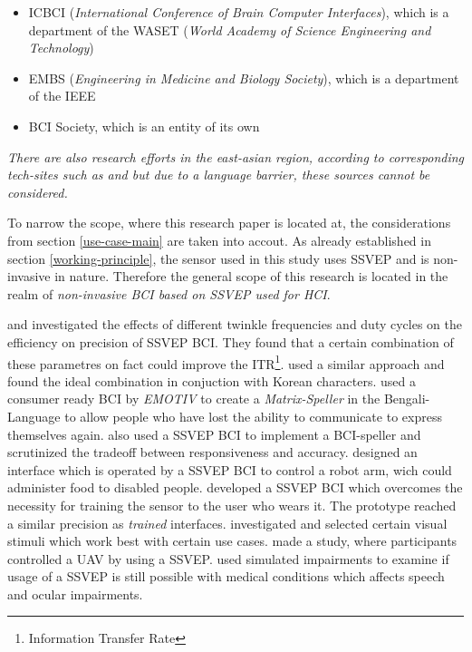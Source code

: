             \begin{itemize}
                \item ICBCI (\textit{International Conference of Brain Computer Interfaces}), which is a department of the WASET (\textit{World Academy of Science Engineering and Technology})
                \item EMBS (\textit{Engineering in Medicine and Biology Society}), which is a department of the IEEE
                \item BCI Society, which is an entity of its own
            \end{itemize}

            \medskip

            \emph{There are also research efforts in the east-asian region, according to corresponding tech-sites such as \cite{GlobalTimes.20042021} and \cite{TechwireAsia.24052021} but due to a language barrier, these sources cannot be considered.}

            \medskip

            To narrow the scope, where this research paper is located at, the considerations from section \ref*{use-case-main} are taken into accout. As already established in section \ref*{working-principle}, the sensor used in this study uses SSVEP and is non-invasive in nature. Therefore the general scope of this research is located in the realm of \textit{non-invasive BCI based on SSVEP used for HCI}.

            \medskip

            \cite{Oralhan.2016} and \cite{Resalat.2011} investigated the effects of different twinkle frequencies and duty cycles on the efficiency on precision of SSVEP BCI. They found that a certain combination of these parametres on fact could improve the ITR\footnote{Information Transfer Rate}. \cite{Lee.2016} used a similar approach and found the ideal combination in conjuction with Korean characters.
            \cite{S.M.Abdullah.2014} used a consumer ready BCI by \textit{EMOTIV} to create a \textit{Matrix-Speller} in the Bengali-Language to allow people who have lost the ability to communicate to express themselves again. 
            \cite{Chen.2020} also used a SSVEP BCI to implement a BCI-speller and scrutinized the tradeoff between responsiveness and accuracy.
            \cite{Chen.2020} designed an interface which is operated by a SSVEP BCI to control a robot arm, wich could administer food to disabled people.
            \cite{Soroush.2018} developed a SSVEP BCI which overcomes the necessity for training the sensor to the user who wears it. The prototype reached a similar precision as \textit{trained} interfaces.
            \cite{Gergondet.2015} investigated and selected certain visual stimuli which work best with certain use cases.
            \cite{Merino.2017} made a study, where participants controlled a UAV by using a SSVEP.
            \cite{Peters.2018} used simulated impairments to examine if usage of a SSVEP is still possible with medical conditions which affects speech and ocular impairments.

